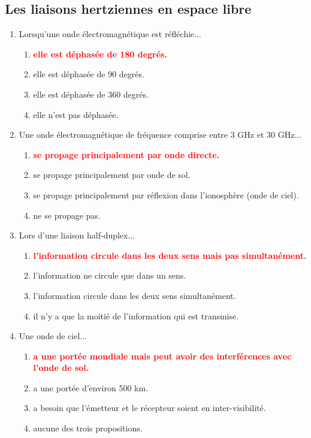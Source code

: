 \documentclass[a4paper]{article}
\begin{document}
\subsection{Les liaisons hertziennes en espace libre}





\begin{enumerate}[label=Q\arabic*.]


\item  Lorsqu'une onde électromagnétique est réfléchie...
\begin{enumerate}
    \item \textcolor{red}{\textbf{elle est déphasée de 180 degrés.}}
    \item elle est déphasée de 90 degrés.
    \item elle est déphasée de 360 degrés.
    \item elle n'est pas déphasée.
\end{enumerate}


\item Une onde électromagnétique de fréquence comprise entre 3 GHz et 30 GHz...
\begin{enumerate}
    \item \textcolor{red}{\textbf{se propage principalement par onde directe.}}
    \item se propage principalement par onde de sol.
    \item se propage principalement par réflexion dans l'ionosphère (onde de ciel).
    \item ne se propage pas.
\end{enumerate}


\item Lors d'une liaison half-duplex...
\begin{enumerate}
    \item \textcolor{red}{\textbf{l'information circule dans les deux sens mais pas simultanément.}}
    \item l'information ne circule que dans un sens.
    \item l'information circule dans les deux sens simultanément.
    \item il n'y a que la moitié de l'information qui est transmise.
\end{enumerate}


\item Une onde de ciel...
\begin{enumerate}
    \item \textcolor{red}{\textbf{a une portée mondiale mais peut avoir des interférences avec l'onde de sol.}}
    \item a une portée d'environ 500 km.
    \item a besoin que l'émetteur et le récepteur soient en inter-visibilité.
    \item aucune des trois propositions.
\end{enumerate}



\end{enumerate}
\end{document}
